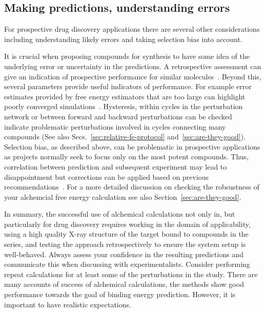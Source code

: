 \documentclass[9pt,bestpractices]{livecoms}
\begin{document}
\subsection{Making predictions, understanding errors}
\label{subsec:predictions}
For prospective drug discovery applications there are several other considerations including understanding likely errors and taking selection bias into account. 

It is crucial when proposing compounds for synthesis to have some idea of the underlying error or uncertainty in the predictions. A retrospective assessment can give an indication of prospective performance for similar molecules~\cite{ciordia2016application}. Beyond this, several parameters provide useful indicators of performance. For example error estimates provided by free energy estimators that are too large can highlight poorly converged simulations~\cite{perez-benito2019predicting}. Hysteresis, within cycles in the perturbation network or between forward and backward perturbations can be checked~\cite{wang2013modeling} indicate problematic perturbations involved in cycles connecting many compounds (See also Secs.~\ref{sec:relative-fe-protocol} and~\ref{sec:are-they-good}). Selection bias, as described above, can be problematic in prospective applications as projects normally seek to focus only on the most potent compounds. Thus, correlation between prediction and subsequent experiment may lead to disappointment but corrections can be applied based on previous recommendations~\cite{abel2017critical}. For a more detailed discussion on checking the robsustness of your alchemcial free energy calculation see also Section~\ref{sec:are-they-good}.

In summary, the successful use of alchemical calculations not only in, but particularly for drug discovery requires working in the domain of applicability, using a high quality X-ray structure of the target bound to compounds in the series, and testing the approach retrospectively to ensure the system setup is well-behaved. Always assess your confidence in the resulting predictions and communicate this when discussing with experimentalists. Consider performing repeat calculations for at least some of the perturbations in the study. 
 There are many accounts of success of alchemical calculations, the methods show good performance towards the goal of binding energy prediction. However, it is important to have realistic expectations. 
\end{document}
